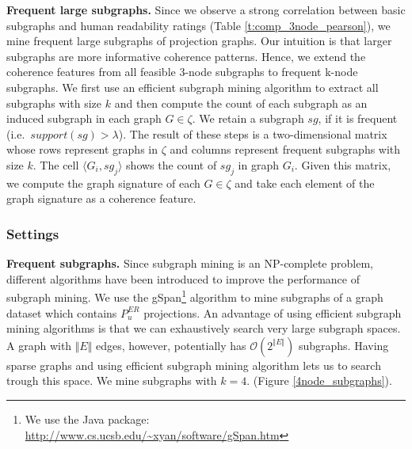 \textbf{Frequent large subgraphs.} Since we observe a strong correlation between basic subgraphs and human readability ratings
(Table \ref{t:comp_3node_pearson}), we mine frequent large subgraphs of projection graphs. 
Our intuition is that larger subgraphs are more informative coherence patterns. 
Hence, we extend the coherence features from all feasible 3-node subgraphs to frequent k-node subgraphs. 
We first use an efficient subgraph mining algorithm to extract all subgraphs with size $k$ and then compute the count of each subgraph as an induced subgraph in each graph $G\in\zeta$. 
We retain a subgraph $sg$, if it is frequent (i.e.\ $support(sg)>\lambda$). 
The result of these steps is a two-dimensional matrix whose rows represent graphs in $\zeta$ and columns represent frequent subgraphs with size $k$. 
The cell $\langle G_i,sg_j\rangle$ shows the count of $sg_j$ in graph $G_i$. Given this matrix, we compute the graph signature of each $G\in\zeta$ and take
each element of the graph signature as a coherence feature.



\subsubsection{Settings}
%
\textbf{Frequent subgraphs.} Since subgraph mining is an NP-complete problem, different algorithms have been introduced to
improve the performance of subgraph mining. 
We use the gSpan\footnote{We use the Java package: \url{http://www.cs.ucsb.edu/~xyan/software/gSpan.htm}} algorithm \cite{yanxifeng02} to mine subgraphs of a graph dataset which contains $P_u^{ER}$ projections. 
An advantage of using efficient subgraph mining algorithms is that we can exhaustively search very large subgraph spaces. 
A graph with $\Vert E \Vert$ edges, however, potentially has $\mathcal{O}(2^{\Vert E \Vert})$ subgraphs. 
Having sparse graphs and using efficient subgraph mining algorithm lets us to search trough this space. 
We mine subgraphs with $k=4$. (Figure \ref{4node_subgraphs}).




%



